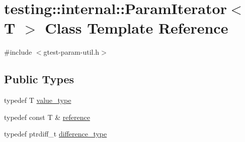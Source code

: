 \hypertarget{classtesting_1_1internal_1_1ParamIterator}{}\section{testing\+:\+:internal\+:\+:Param\+Iterator$<$ T $>$ Class Template Reference}
\label{classtesting_1_1internal_1_1ParamIterator}


{\ttfamily \#include $<$gtest-\/param-\/util.\+h$>$}

\subsection*{Public Types}
\begin{DoxyCompactItemize}
\item 
typedef T \hyperlink{classtesting_1_1internal_1_1ParamIterator_a4afe3a68db0d0744753c8afe262e35df}{value\+\_\+type}
\item 
typedef const T \& \hyperlink{classtesting_1_1internal_1_1ParamIterator_ac96f133ffa06fc0f9faff5a1c7954382}{reference}
\item 
typedef ptrdiff\+\_\+t \hyperlink{classtesting_1_1internal_1_1ParamIterator_a6c37240a04ba3fc4c56f6c413cf4771d}{difference\+\_\+type}
\end{DoxyCompactItemize}
